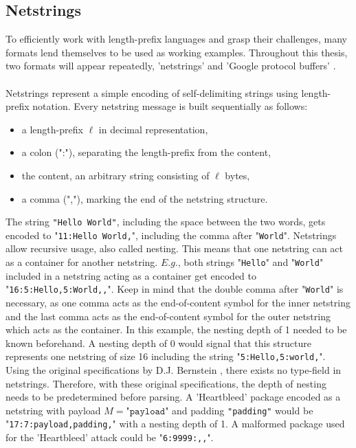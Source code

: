 \subsection{Netstrings}
\label{1.4}
To efficiently work with length-prefix languages and grasp their challenges, many formats lend themselves to be used as working examples. Throughout this thesis, two formats will appear repeatedly, 'netstrings' and 'Google protocol buffers' \cite{google-protobuf-overview}.\\\\
Netstrings \cite{netstrings} represent a simple encoding of self-delimiting strings using length-prefix notation. Every netstring message is built sequentially as follows:
\begin{itemize}
    \item a length-prefix $\ell$ in decimal representation,
    \item a colon (":"), separating the length-prefix from the content,
    \item the content, an arbitrary string consisting of $\ell$ bytes,
    \item a comma (","), marking the end of the netstring structure.
\end{itemize}
The string \texttt{"Hello World"}, including the space between the two words, gets encoded to "\texttt{11:Hello World,}", including the comma after "\texttt{World}". Netstrings allow recursive usage, also called nesting. This means that one netstring can act as a container for another netstring. $E.g.$, both strings "\texttt{Hello}" and "\texttt{World}" included in a netstring acting as a container get encoded to "\texttt{16:5:Hello,5:World,,}". Keep in mind that the double comma after "\texttt{World}" is necessary, as one comma acts as the end-of-content symbol for the inner netstring and the last comma acts as the end-of-content symbol for the outer netstring which acts as the container. In this example, the nesting depth of 1 needed to be known beforehand. A nesting depth of 0 would signal that this structure represents one netstring of size 16 including the string "\texttt{5:Hello,5:world,}". Using the original specifications by D.J. Bernstein \cite{netstrings}, there exists no type-field in netstrings. Therefore, with these original specifications, the depth of nesting needs to be predetermined before parsing. A 'Heartbleed' package encoded as a netstring with payload $M=\texttt{"payload"}$ and padding \texttt{"padding"} would be "\texttt{17:7:payload,padding,}" with a nesting depth of 1. A malformed package used for the 'Heartbleed' attack could be "\texttt{6:9999:,,}".\\\\
